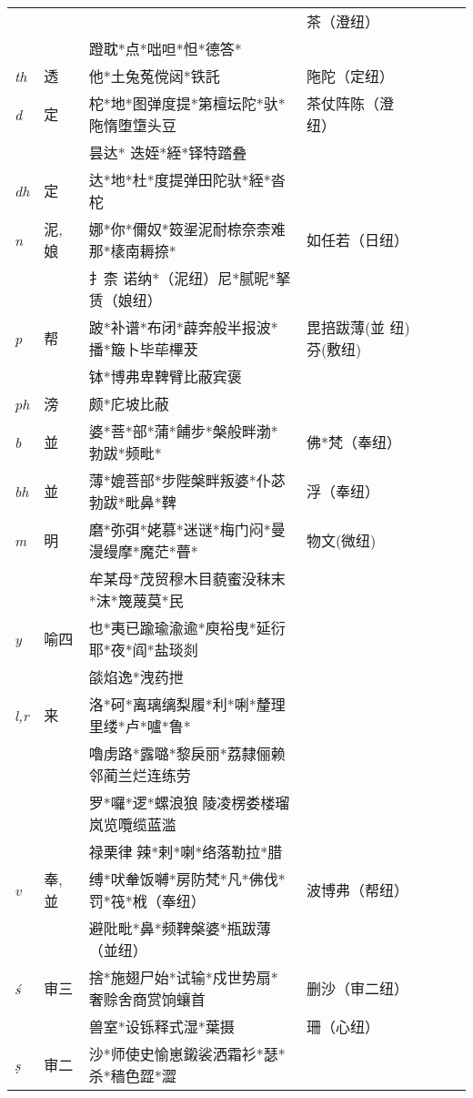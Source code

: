 \documentclass[oneside,a4paper,11pt]{article}
\newcommand{\ipa}[1]{{\phon\textit{#1}}}
\newcommand{\zh}[1]{{\cn #1}}
\begin{document}
\begin{table}[h]
{\begin{tabular}{lllllll}
&&&\zh{茶（澄纽）} \\
&&\zh{蹬耽*点*咄呾*怛*德答*} \\
\ipa{th} &	\zh{透} &	\zh{他*土兔菟傥闼*铁託} &	\zh{陁陀（定纽）} \\
\ipa{d} &	\zh{定} &	\zh{柁*地*图弹度提*第檀坛陀*驮*陁惰堕墯头豆} &	\zh{茶仗阵陈（澄纽）} \\
&&\zh{昙达* 迭姪*絰*铎特踏叠} \\
\ipa{dh} &	\zh{定} &	\zh{达*地*杜*度提弹田陀驮*絰*沓柁} &	\zh{} \\
\ipa{n} &	\zh{泥,娘} &	\zh{娜*你*儞奴*笯埿泥耐㮈奈柰难那*橠南耨捺*} &	\zh{如任若（日纽）} \\
&&\zh{扌柰 诺纳*（泥纽）尼*腻昵*拏赁（娘纽）} \\
\midrule
\ipa{p} &	\zh{帮} &	\zh{跛*补谱*布闭*薜奔般半报波*播*簸卜毕荜㮿茇} &	\zh{毘掊跋薄(並 纽)芬(敷纽)} \\
&&\zh{钵*博弗卑鞞臂比蔽宾褒} \\
\ipa{ph} &	\zh{滂} &	\zh{颇*庀坡比蔽} & \\
\ipa{b} &	\zh{並} &	\zh{婆*菩*部*蒲*餔步*槃般畔渤*勃跋*频毗*} &	\zh{佛*梵（奉纽）} \\
\ipa{bh} &	\zh{並} &	\zh{薄*媲菩部*步陛槃畔叛婆*仆苾勃跋*毗鼻*鞞} &	\zh{浮（奉纽）} \\
\ipa{m} &	\zh{明} &	\zh{磨*弥弭*姥慕*迷谜*梅门闷*曼漫缦摩*魔茫*瞢*} &	\zh{物文(微纽)} \\
&&\zh{牟某母*茂贸穆木目藐蜜没秣末*沫*篾蔑莫*民} \\
\midrule
\ipa{y} &	\zh{喻四} &	\zh{也*夷已踰瑜渝逾*庾裕曳*延衍耶*夜*阎*盐琰剡} & \\
&&\zh{燄焰逸*洩药抴} \\
\ipa{l,r} &	\zh{来} &	\zh{洛*砢*离璃缡梨履*利*唎*釐理里缕*卢*嚧*鲁*} & \\
&&\zh{嚕虏路*露𡀔*黎戾丽*荔隸俪赖邻蔺兰烂连练劳} \\
&&\zh{罗*囉*逻*螺浪狼𩜁陵凌楞娄楼瑠岚览囕缆蓝滥} \\
&&\zh{禄栗律𢫫辣*剌*喇*络落勒拉*腊} \\
\ipa{v} &	\zh{奉, 並} &	\zh{缚*吠軬饭嚩*房防梵*凡*佛伐*罚*筏*栰（奉纽）} &\zh{波博弗（帮纽）} \\
&&\zh{避阰毗*鼻*频鞞槃婆*瓶跋薄（並纽）} \\
\midrule
\ipa{ś} &	\zh{审三} &	\zh{捨*施翅尸始*试输*戍世势扇*奢赊舍商赏饷蠰首} &	\zh{删沙（审二纽） } \\
&&\zh{兽室*设铄释式湿*葉摄} & \zh{珊（心纽）} \\
\ipa{ṣ} &	\zh{审二} &	\zh{沙*师使史愉崽鎩裟洒霜衫*瑟*杀*穑色歰*澀} & \\

\end{tabular}}
\end{table}
\end{document}
